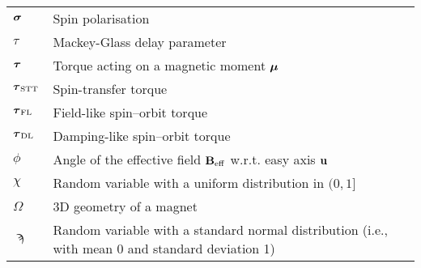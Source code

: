 \begin{longtable}[l]{p{60pt} p{350pt}}
	$\boldsymbol{\mathbf{\sigma}}$ & Spin polarisation \\[\whiteline]

	$\tau$ & Mackey-Glass delay parameter \\
	$\boldsymbol{\mathbf{\tau}}$ & Torque acting on a magnetic moment $\boldsymbol{\mathbf{\mu}}$ \\
	$\boldsymbol{\mathbf{\tau}}_\mathrm{STT}$ & Spin-transfer torque \\
	$\boldsymbol{\mathbf{\tau}}_\mathrm{FL}$ & Field-like spin--orbit torque \\
	$\boldsymbol{\mathbf{\tau}}_\mathrm{DL}$ & Damping-like spin--orbit torque \\[\whiteline]

	$\phi$ & Angle of the effective field $\boldsymbol{\mathbf{B}}_\mathrm{eff}$ w.r.t. easy axis $\boldsymbol{\mathbf{u}}$ \\[\whiteline]

	$\chi$ & Random variable with a uniform distribution in $(0, 1]$ \\[\whiteline]
	
	$\Omega$ & 3D geometry of a magnet \\[\whiteline]
	
	$\sampi$ & Random variable with a standard normal distribution (i.e., with mean 0 and standard deviation 1) \\
\end{longtable}
